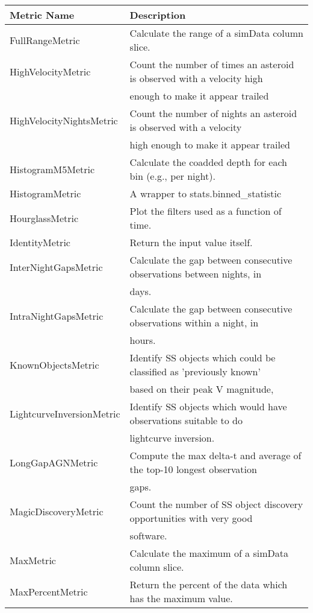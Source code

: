 \begin{table}
\scriptsize
\begin{tabular}{ll}
\hline
                   Metric Name &                                                             Description \\
\hline
 FullRangeMetric &  Calculate the range of a simData column slice. \\
 HighVelocityMetric &  Count the number of times an asteroid is observed with a velocity high \\
  &  enough to make it appear trailed \\
 HighVelocityNightsMetric &  Count the number of nights an asteroid is observed with a velocity \\
  &  high enough to make it appear trailed \\
 HistogramM5Metric &  Calculate the coadded depth for each bin (e.g., per night). \\
 HistogramMetric &  A wrapper to stats.binned\_statistic \\
 HourglassMetric &  Plot the filters used as a function of time. \\
 IdentityMetric &  Return the input value itself. \\
 InterNightGapsMetric &  Calculate the gap between consecutive observations between nights, in \\
  &  days. \\
 IntraNightGapsMetric &  Calculate the gap between consecutive observations within a night, in \\
  &  hours. \\
 KnownObjectsMetric &  Identify SS objects which could be classified as 'previously known' \\
  &  based on their peak V magnitude, \\
 LightcurveInversionMetric &  Identify SS objects which would have observations suitable to do \\
  &  lightcurve inversion. \\
 LongGapAGNMetric &  Compute the max delta-t and average of the top-10 longest observation \\
  &  gaps. \\
 MagicDiscoveryMetric &  Count the number of SS object discovery opportunities with very good \\
  &  software. \\
 MaxMetric &  Calculate the maximum of a simData column slice. \\
 MaxPercentMetric &  Return the percent of the data which has the maximum value. \\

\end{tabular}
\end{table}
